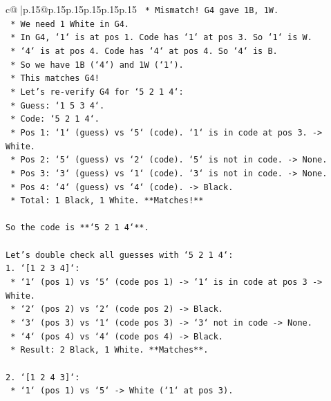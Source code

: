 \documentclass{article}
\begin{document}
{\begin{supertabular}{c@{$\;$}|p{.15\linewidth}@{}p{.15\linewidth}p{.15\linewidth}p{.15\linewidth}p{.15\linewidth}p{.15\linewidth}}
{{{\texttt{            *   Mismatch! G4 gave 1B, 1W.} \\
\texttt{            *   We need 1 White in G4.} \\
\texttt{            *   In G4, `1` is at pos 1. Code has `1` at pos 3. So `1` is W.} \\
\texttt{            *   `4` is at pos 4. Code has `4` at pos 4. So `4` is B.} \\
\texttt{            *   So we have 1B (`4`) and 1W (`1`).} \\
\texttt{            *   This matches G4!} \\
\texttt{            *   Let's re{-}verify G4 for `5 2 1 4`:} \\
\texttt{                *   Guess: `1 5 3 4`.} \\
\texttt{                *   Code: `5 2 1 4`.} \\
\texttt{                *   Pos 1: `1` (guess) vs `5` (code). `1` is in code at pos 3. {-}> White.} \\
\texttt{                *   Pos 2: `5` (guess) vs `2` (code). `5` is not in code. {-}> None.} \\
\texttt{                *   Pos 3: `3` (guess) vs `1` (code). `3` is not in code. {-}> None.} \\
\texttt{                *   Pos 4: `4` (guess) vs `4` (code). {-}> Black.} \\
\texttt{                *   Total: 1 Black, 1 White. **Matches!**} \\
\\ 
\texttt{So the code is **`5 2 1 4`**.} \\
\\ 
\texttt{Let's double check all guesses with `5 2 1 4`:} \\
\texttt{1.  `{[}1 2 3 4{]}`:} \\
\texttt{    *   `1` (pos 1) vs `5` (code pos 1) {-}> `1` is in code at pos 3 {-}> White.} \\
\texttt{    *   `2` (pos 2) vs `2` (code pos 2) {-}> Black.} \\
\texttt{    *   `3` (pos 3) vs `1` (code pos 3) {-}> `3` not in code {-}> None.} \\
\texttt{    *   `4` (pos 4) vs `4` (code pos 4) {-}> Black.} \\
\texttt{    *   Result: 2 Black, 1 White. **Matches**.} \\
\\ 
\texttt{2.  `{[}1 2 4 3{]}`:} \\
\texttt{    *   `1` (pos 1) vs `5` {-}> White (`1` at pos 3).} \\
}}}
\end{supertabular}}
\end{document}

